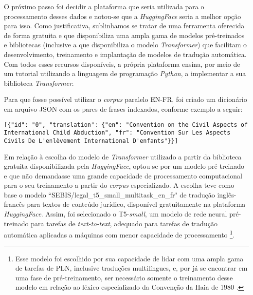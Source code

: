 \documentclass[portuguese]{textolivre}
\begin{document}
O próximo passo foi decidir a plataforma que seria utilizada para o processamento desses dados e notou-se que a \textit{HuggingFace} seria a melhor opção para isso. Como justificativa, sublinhamos se tratar de uma ferramenta oferecida de forma gratuita e que disponibiliza uma ampla gama de modelos pré-treinados e bibliotecas (inclusive a que disponibiliza o modelo \textit{Transformer}) que facilitam o desenvolvimento, treinamento e implantação de modelos de tradução automática. Com todos esses recursos disponíveis, a própria plataforma ensina, por meio de um tutorial utilizando a linguagem de programação \textit{Python}, a implementar a sua biblioteca \textit{Transformer}.

Para que fosse possível utilizar o \textit{corpus} paralelo EN-FR, foi criado um dicionário em arquivo JSON com os pares de frases indexados, conforme exemplo a seguir:

\begin{lstlisting}[style=json, caption={Amostra de dicionário em formato JSON relativo a \textit{corpus} paralelo EN-FR}, label=lst01]
[{"id": "0", "translation": {"en": "Convention on the Civil Aspects of International Child Abduction", "fr": "Convention Sur Les Aspects Civils De L'enlèvement International D'enfants"}}]
\end{lstlisting} %





Em relação à escolha do modelo de \textit{Transformer} utilizado a partir da biblioteca gratuita disponibilizada pela \textit{HuggingFace}, optou-se por um modelo pré-treinado e que não demandasse uma grande capacidade de processamento computacional para o seu treinamento a partir do \textit{corpus} especializado. A escolha teve como base o modelo “SEBIS/legal\_t5\_small\_multitask\_en\_fr" de tradução inglês-francês para textos de conteúdo jurídico, disponível gratuitamente na plataforma \textit{HuggingFace}. Assim, foi selecionado o T5-\textit{small}, um modelo de rede neural pré-treinado para tarefas de \textit{text-to-text}, adequado para tarefas de tradução automática aplicadas a máquinas com menor capacidade de processamento \cite{raffel_exploring_2020}\footnote{Esse modelo foi escolhido por sua capacidade de lidar com uma ampla gama de tarefas de PLN, inclusive traduções multilíngues, e, por já se encontrar em uma fase de pré-treinamento, ser necessário somente o treinamento desse modelo em relação ao léxico especializado da Convenção da Haia de 1980 \cite{raffel_exploring_2020}.}.
\end{document}
